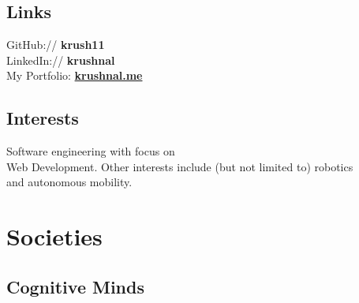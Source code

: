 \documentclass[letterpaper]{deedy-resume} %
\begin{document}
\begin{minipage}[t]{0.33\textwidth}
\subsection{Links}
GitHub:// {\bf krush11} \\
LinkedIn:// {\bf krushnal} \\
My Portfolio: \textbf{\href{http://krushnal.me/}{krushnal.me}} \\

\sectionspace

\subsection{Interests}
Software engineering with focus on \\
Web Development. Other interests include 
(but not limited to) robotics\\
and autonomous mobility.

\sectionspace %

\section{Societies}
\subsection{Cognitive Minds}

\sectionspace %

\end{minipage} %
\hfill
%
%
\end{document}
